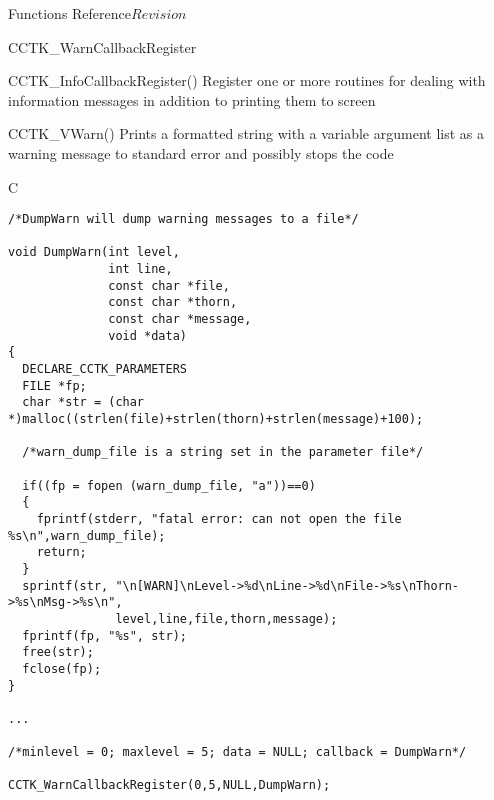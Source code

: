 \begin{cactuspart}{ Functions Reference}{}{$Revision$}
\begin{FunctionDescription}{CCTK\_WarnCallbackRegister}
\begin{SeeAlsoSection}
\begin{SeeAlso}{CCTK\_InfoCallbackRegister()}
Register one or more routines for dealing with information messages in
addition to printing them to screen
\end{SeeAlso}

\begin{SeeAlso}{CCTK\_VWarn()}
Prints a formatted string with a variable argument list as a warning message
to standard error and possibly stops the code
\end{SeeAlso}

\end{SeeAlsoSection}

\begin{ExampleSection}
\begin{Example}{C}
\begin{verbatim}
/*DumpWarn will dump warning messages to a file*/

void DumpWarn(int level,
              int line,
              const char *file,
              const char *thorn,
              const char *message,
              void *data)
{
  DECLARE_CCTK_PARAMETERS
  FILE *fp;
  char *str = (char *)malloc((strlen(file)+strlen(thorn)+strlen(message)+100);

  /*warn_dump_file is a string set in the parameter file*/

  if((fp = fopen (warn_dump_file, "a"))==0)
  {
    fprintf(stderr, "fatal error: can not open the file %s\n",warn_dump_file);
    return;
  }
  sprintf(str, "\n[WARN]\nLevel->%d\nLine->%d\nFile->%s\nThorn->%s\nMsg->%s\n",
               level,line,file,thorn,message);
  fprintf(fp, "%s", str);
  free(str);
  fclose(fp);
}

...

/*minlevel = 0; maxlevel = 5; data = NULL; callback = DumpWarn*/

CCTK_WarnCallbackRegister(0,5,NULL,DumpWarn);
\end{verbatim}
\end{Example}
\end{ExampleSection}
\end{FunctionDescription}


\end{cactuspart}
